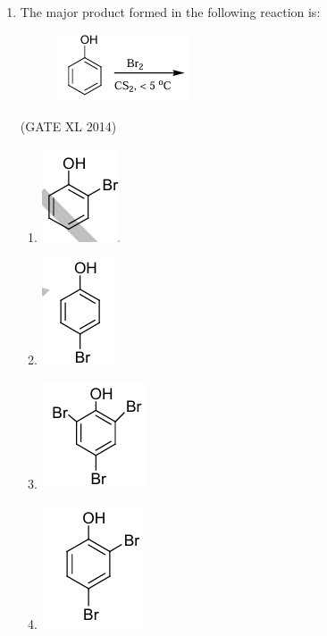 \documentclass[journal,12pt,onecolumn]{IEEEtran}
\theoremstyle{remark}
\begin{document}
\begin{enumerate}
  \item The major product formed in the following reaction is:  
  \begin{figure}[H]
      \centering
      \includegraphics[width=0.34\columnwidth]{fig3.png}
      \caption{}
      \label{fig:placeholder}
  \end{figure} 
  \hfill (GATE XL 2014)\\
  \begin{multicols}{2}
  \begin{enumerate}
    \item \includegraphics[width=0.2\columnwidth]{fig4.png}
    \item \includegraphics[width=0.2\columnwidth]{fig5.png}
    \item \includegraphics[width=0.2\columnwidth]{fig6.png}
    \item \includegraphics[width=0.2\columnwidth]{fig7.png}
  \end{enumerate}
  \end{multicols}


\end{enumerate}
\end{document}
